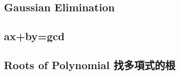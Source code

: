 \documentclass[a4paper,10pt,twocolumn,oneside]{article}
\begin{document}
%

%

\subsection{Gaussian Elimination}


\subsection{ax+by=gcd}


%

% 

%

%

%

\subsection{Roots of Polynomial 找多項式的根}

\end{document}
